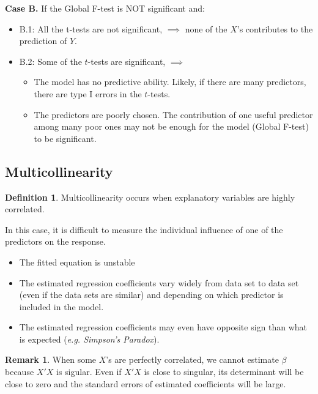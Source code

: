 \documentclass[11pt]{article}
\theoremstyle{definition}
\newtheorem{definition}{Definition}[section]
\newtheorem{remark}{Remark}[section]
\numberwithin{equation}{section}
\begin{document}
\textbf{Case B.} If the Global F-test is NOT significant and:
\begin{itemize}
\item B.1: All the t-tests are not significant, $\implies$ none of the $X$'s contributes to the prediction of $Y$.
\item B.2: Some of the $t$-tests are significant, $\implies$
\begin{itemize}
\item The model has no predictive ability. Likely, if there are many predictors, there are type I errors in the $t$-tests.
\item The predictors are poorly chosen. The contribution of one useful predictor among many poor ones may not be enough for the model (Global F-test) to be significant.
\end{itemize}
\end{itemize}


\subsection{Multicollinearity}

\begin{definition}
  Multicollinearity occurs when explanatory variables are highly correlated.
\end{definition}
\begin{writenotes}
  In this case, it is difficult to measure the individual influence of one of the predictors on the response.
\begin{itemize}
\item The fitted equation is unstable
\item The estimated regression coefficients vary widely from data set to data set (even if the data sets are similar) and depending on which predictor is included in the model.
\item The estimated regression coefficients may even have opposite sign than what is expected (\textit{e.g. Simpson's Paradox}).
\end{itemize}
\end{writenotes}

\begin{remark}
  When some $X$'s are perfectly correlated, we cannot estimate $\beta$ because $X'X$ is sigular. Even if $X'X$ is close to singular, its determinant will be close to zero and the standard errors of estimated coefficients will be large.
\end{remark}
\end{document}
